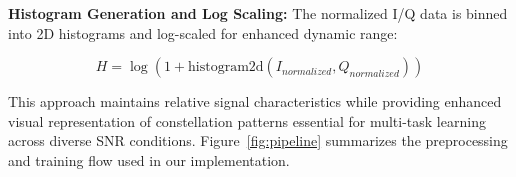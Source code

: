 \documentclass{ELSP}
\begin{document}
\textbf{Histogram Generation and Log Scaling:} The normalized I/Q data is binned into 2D histograms and log-scaled for enhanced dynamic range:

\begin{equation}
H = \log(1 + \text{histogram2d}(I_{normalized}, Q_{normalized}))
\end{equation}

This approach maintains relative signal characteristics while providing enhanced visual representation of constellation patterns essential for multi-task learning across diverse SNR conditions.
Figure~\ref{fig:pipeline} summarizes the preprocessing and training flow used in our implementation.

\end{document}

